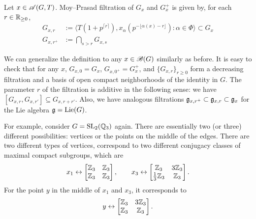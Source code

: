 \begin{definition}
Let $x \in \mathscr{A}(G, T)$.
Moy--Prasad filtration of $G_x$ and $G_x^+$ is given by, for each $r \in \mathbb{R}_{\ge 0}$,
\begin{align}
    G_{x, r} &:= \langle T(1 + p^{\lceil r \rceil}), x_{\alpha}(p^{-\lfloor \alpha(x) - r \rfloor}) : \alpha \in \Phi \rangle \subset G_x \\
    G_{x, r^+} &:= \bigcap_{s > r} G_{x, s}
\end{align}
\end{definition}
We can generalize the definition to any $x \in \mathscr{B}(G)$ similarly as before.
It is easy to check that for any $x$, $G_{x, 0} = G_{x}$, $G_{x, 0^+} = G_{x}^+$, and $\{G_{x, r}\}_{r \ge 0}$ form a decreasing filtration and a basis of open compact neighborhoods of the identity in $G$.
The parameter $r$ of the filtration is additive in the following sense: we have $[G_{x, r}, G_{x, r'}] \subseteq G_{x, r + r'}$.
Also, we have analogous filtrations $\mathfrak{g}_{x, r^+} \subset \mathfrak{g}_{x, r} \subset \mathfrak{g}_{x}$ for the Lie algebra $\mathfrak{g} = \mathrm{Lie}(G)$.

For example, consider $G = \mathrm{SL}_2(\mathbb{Q}_3)$ again.
There are essentially two (or three) different possibilities: vertices or the points on the middle of the edges.
There are two different types of vertices, correspond to two different conjugacy classes of maximal compact subgroups, which are
\[
    x_1 \leftrightarrow \begin{bmatrix} \mathbb{Z}_3 & \mathbb{Z}_3 \\ \mathbb{Z}_3 & \mathbb{Z}_3 \end{bmatrix}, \qquad x_3 \leftrightarrow \begin{bmatrix} \mathbb{Z}_3 & 3 \mathbb{Z}_3 \\ \frac{1}{3} \mathbb{Z}_3 & \mathbb{Z}_3 \end{bmatrix}.
\]
For the point $y$ in the middle of $x_1$ and $x_3$, it corresponds to
\[
    y \leftrightarrow \begin{bmatrix}
        \mathbb{Z}_3 & 3 \mathbb{Z}_3 \\ \mathbb{Z}_3 & \mathbb{Z}_3
    \end{bmatrix}.
\]

